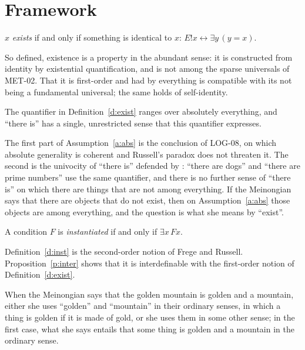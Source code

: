 \documentclass{situationist-preprint}
\begin{document}
\section{Framework}\label{s:frame}

\begin{definition}[Existence]\label{d:exist}
$x$ \emph{exists} if and only if something is identical to $x$: $E!x \leftrightarrow \exists y\, (y = x)$.
\end{definition}

So defined, existence is a property in the abundant sense: it is constructed from identity by existential quantification, and is not among the sparse universals of MET-02. That it is first-order and had by everything is compatible with its not being a fundamental universal; the same holds of self-identity.

\begin{assumption}\label{a:abs}
The quantifier in Definition~\ref{d:exist} ranges over absolutely everything, and \enquote{there is} has a single, unrestricted sense that this quantifier expresses.
\end{assumption}

The first part of Assumption~\ref{a:abs} is the conclusion of LOG-08, on which absolute generality is coherent and Russell's paradox does not threaten it. The second is the univocity of \enquote{there is} defended by \citet{vanInwagen1998}: \enquote{there are dogs} and \enquote{there are prime numbers} use the same quantifier, and there is no further sense of \enquote{there is} on which there are things that are not among everything. If the Meinongian says that there are objects that do not exist, then on Assumption~\ref{a:abs} those objects are among everything, and the question is what she means by \enquote{exist}.

\begin{definition}[Instantiation]\label{d:inst}
A condition $F$ is \emph{instantiated} if and only if $\exists x\, F x$.
\end{definition}

Definition~\ref{d:inst} is the second-order notion of Frege and Russell. Proposition~\ref{p:inter} shows that it is interdefinable with the first-order notion of Definition~\ref{d:exist}.

\begin{assumption}\label{a:univ}
When the Meinongian says that the golden mountain is golden and a mountain, either she uses \enquote{golden} and \enquote{mountain} in their ordinary senses, in which a thing is golden if it is made of gold, or she uses them in some other sense; in the first case, what she says entails that some thing is golden and a mountain in the ordinary sense.
\end{assumption}
\end{document}
